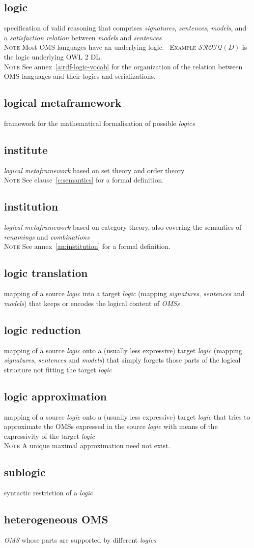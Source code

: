 \documentclass[10pt,%
\ifpretendfinal
final%
\else
draft%
\fi,
]{scrreprt}
\newcommand*{\termref}[1]{\textit{#1}}
\newcommand{\termdefinition}[2]{\subsection*{#1}#2}
\newenvironment{definitions}[0]{\medskip }{}
\newenvironment{note}[0]{\ \\ \textsc{Note} \quad}{}
\newenvironment{example}[0]{\ \newline \textsc{Example}\quad }{}
\begin{document}
\begin{definitions}
  \termdefinition{logic}{specification of valid reasoning that comprises \termref{signatures}, \termref{sentences},
  \termref{models}, and a \termref{satisfaction relation} between \termref{models} and \termref{sentences}}
  \begin{note}
    Most OMS languages have an underlying logic.
  \end{note}
  \begin{example}
    $\mathcal{SROIQ}(D)$ is the logic underlying OWL 2 DL.
  \end{example}
  \begin{note}
   See annex~\ref{a:rdf-logic-vocab} for the organization of the
   relation between OMS languages and their logics and serializations.
  \end{note}

  \termdefinition{logical metaframework}{framework for the mathematical formalisation of possible \termref{logics}}


  \termdefinition{institute}{\termref{logical metaframework} based on set
    theory and order theory}
\begin{note}
 See clause~\ref{c:semantics} for a formal definition.
\end{note}

 \termdefinition{institution}{\termref{logical metaframework} based on category theory,  also covering the semantics of
   \termref{renamings} and \termref{combinations}}
\begin{note}
 See annex~\ref{an:institution} for a formal definition.
\end{note}

  \termdefinition{logic translation}{mapping of a source
    \termref{logic} into a target \termref{logic} (mapping
    \termref{signatures}, \termref{sentences} and \termref{models})
    that keeps or encodes the logical content of \termref{OMSs}}

  \termdefinition{logic reduction}{mapping of a source \termref{logic}
    onto a (usually less expressive) target \termref{logic} (mapping
    \termref{signatures}, \termref{sentences} and \termref{models})
    that simply forgets those parts of the logical structure not
    fitting the target \termref{logic}}

\termdefinition{logic approximation}{mapping of a source \termref{logic}
  onto a (usually less expressive) target \termref{logic} that tries
  to approximate the OMSs expressed in the source \termref{logic} with
  means of the expressivity of the target \termref{logic}}
\begin{note}
  A unique maximal approximation need not exist.
\end{note}

\termdefinition{sublogic}{syntactic restriction of a \termref{logic}}

  \termdefinition{heterogeneous OMS}{\termref{OMS} whose parts are supported by different \termref{logics}}
\end{definitions}
  
\end{document}
